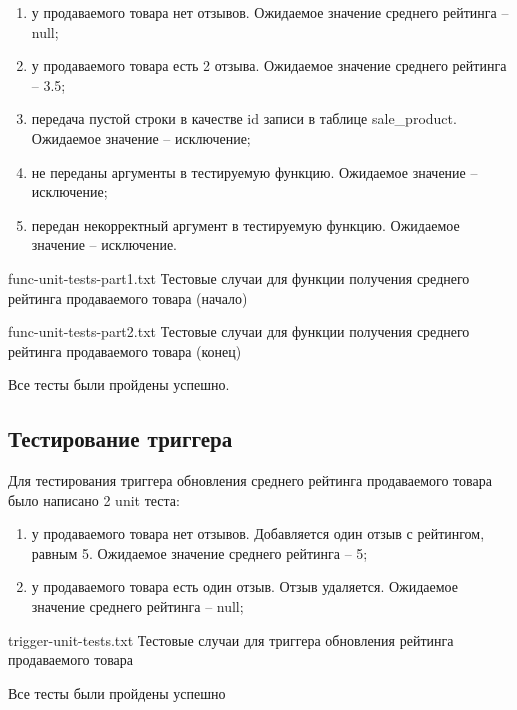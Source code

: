 \begin{enumerate}
	\item у продаваемого товара нет отзывов. Ожидаемое значение среднего рейтинга -- null;
	\item у продаваемого товара есть 2 отзыва. Ожидаемое значение среднего рейтинга -- 3.5;
	\item передача пустой строки в качестве id записи в таблице sale\_product. Ожидаемое значение -- исключение;
	\item не переданы аргументы в тестируемую функцию. Ожидаемое значение -- исключение;
	\item передан некорректный аргумент в тестируемую функцию. Ожидаемое значение -- исключение.
\end{enumerate}

{func-unit-tests-part1.txt} %
{Тестовые случаи для функции получения среднего рейтинга продаваемого товара (начало)} %

{func-unit-tests-part2.txt} %
{Тестовые случаи для функции получения среднего рейтинга продаваемого товара (конец)} %

Все тесты были пройдены успешно.

\clearpage

\subsection{Тестирование триггера}

Для тестирования триггера обновления среднего рейтинга продаваемого товара было написано 2 unit теста:

\begin{enumerate}
	\item у продаваемого товара нет отзывов. Добавляется один отзыв с рейтингом, равным 5. Ожидаемое значение среднего рейтинга -- 5;
	\item у продаваемого товара есть один отзыв. Отзыв удаляется. Ожидаемое значение среднего рейтинга -- null;
\end{enumerate}

{trigger-unit-tests.txt} %
{Тестовые случаи для триггера обновления рейтинга продаваемого товара} %

Все тесты были пройдены успешно

